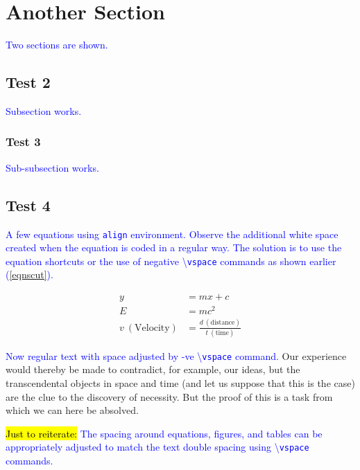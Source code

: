 \documentclass[phd]{ndsu-thesis-2022}
\newcommand\italk[1]{\textcolor{blue}{#1}}  %
\newcommand\cmd[1]{\textbackslash\texttt{#1}}  %
\begin{document}
\section{Another Section}
\italk{Two sections are shown.} \kant[7]

\subsection{Test 2}
\italk{Subsection works.}

\subsubsection{Test 3}
\italk{Sub-subsection works.}

\subsection{Test 4}
\italk{A few equations using \texttt{align} environment. Observe the additional white space created when the equation is coded in a regular way. The solution is to use the equation shortcuts or the use of negative \cmd{vspace} commands as shown earlier (\cref{eqnscut}).}

\begin{align}
y &= mx + c \\
E &= mc^2 \\
v\: (\text{Velocity}) &= \frac{d\: (\text{distance})}{t\: (\text{time})} 
\end{align}

\vspace{-1.5ex}
\italk{Now regular text with space adjusted by -ve \cmd{vspace} command.} Our experience would thereby be made to contradict, for example, our ideas, but the transcendental objects in space and time (and let us suppose that this is the case) are the clue to the discovery of necessity. But the proof of this is a task from which we can here be absolved.

\vspace{-6pt}

\italk{\hl{Just to reiterate:} The spacing around equations, figures, and tables can be appropriately adjusted to match the text double spacing using \cmd{vspace} commands.}
\end{document}
